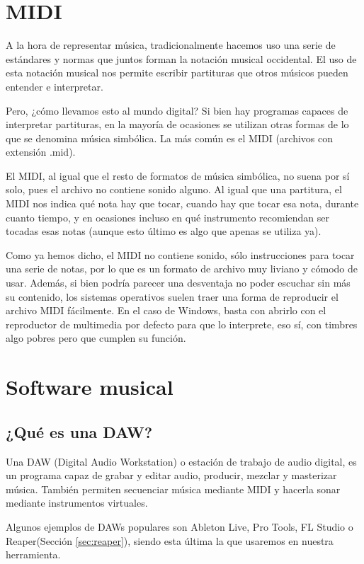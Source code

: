 \section{MIDI}
\label{subsec:que-es-midi}
A la hora de representar música, tradicionalmente hacemos uso una serie de estándares y normas que juntos forman la notación musical occidental. El uso de esta notación musical nos permite escribir partituras que otros músicos pueden entender e interpretar.

Pero, ¿cómo llevamos esto al mundo digital? Si bien hay programas capaces de interpretar partituras, en la mayoría de ocasiones se utilizan otras formas de lo que se denomina música simbólica. La más común es el MIDI (archivos con extensión .mid).

El MIDI, al igual que el resto de formatos de música simbólica, no suena por sí solo, pues el archivo no contiene sonido alguno. Al igual que una partitura, el MIDI nos indica qué nota hay que tocar, cuando hay que tocar esa nota, durante cuanto tiempo, y en ocasiones incluso en qué instrumento recomiendan ser tocadas esas notas (aunque esto último es algo que apenas se utiliza ya).

Como ya hemos dicho, el MIDI no contiene sonido, sólo instrucciones para tocar una serie de notas, por lo que es un formato de archivo muy liviano y cómodo de usar. Además, si bien podría parecer una desventaja no poder escuchar sin más su contenido, los sistemas operativos suelen traer una forma de reproducir el archivo MIDI fácilmente. En el caso de Windows, basta con abrirlo con el reproductor de multimedia por defecto para que lo interprete, eso sí, con timbres algo pobres pero que cumplen su función.

\section{Software musical}

\subsection{¿Qué es una DAW?}
Una DAW (Digital Audio Workstation) o estación de trabajo de audio digital, es un programa capaz de grabar y editar audio, producir, mezclar y masterizar música. También permiten  secuenciar música mediante MIDI y hacerla sonar mediante instrumentos virtuales.

Algunos ejemplos de DAWs populares son Ableton Live, Pro Tools, FL Studio o Reaper(Sección \ref{sec:reaper}), siendo esta última la que usaremos en nuestra herramienta.

